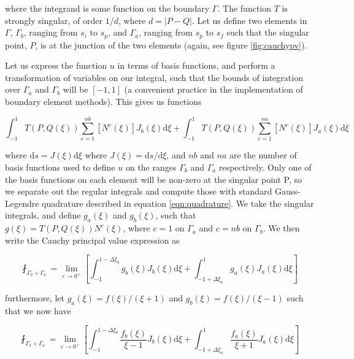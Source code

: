 where the integrand is some function on the boundary $\Gamma$. The function $T$ is strongly singular, of order $1/d$, where $d=|P-Q|$. Let us define two elements in $\Gamma$, $\Gamma_b$, ranging from $s_i$ to $s_p$, and $\Gamma_a$, ranging from $s_p$ to $s_f$ such that the singular point, $P$, is at the junction of the two elements (again, see figure \ref{fig:cauchypv}).

Let us express the function $u$ in terms of basis functions, and perform a transformation of variables on our integral, such that the bounds of integration over $\Gamma_a$ and $\Gamma_b$ will be $[-1,1]$ (a convenient practice in the implementation of boundary element methods). This gives us functions 

\begin{equation}
\int_{-1}^{1} T(P,Q(\xi)) \sum^{nb}_{c=1} \left[ N^c(\xi) \right] J_b(\xi) \mathrm{d}\xi + \int_{-1}^{1} T(P,Q(\xi)) \sum^{na}_{c=1} \left[ N^c(\xi) \right]  J_a(\xi) \mathrm{d}\xi 
\end{equation}

where $\mathrm{d}s = J(\xi) \mathrm{d}\xi$ where $J(\xi) = \mathrm{d}s/\mathrm{d}\xi$, and $nb$ and $na$ are the number of basis functions used to define $u$ on the ranges $\Gamma_b$ and $\Gamma_a$ respectively. Only one of the basis functions on each element will be non-zero at the singular point P, so we separate out the regular integrals and compute those with standard Gauss-Legendre quadrature described in equation \ref{eqn:quadrature}. We take the singular integrals, and define $g_a(\xi)$ and $g_b(\xi)$, such that $g(\xi)=T(P,Q(\xi)) N^c(\xi)$, where $c=1$ on $\Gamma_a$ and $c=nb$ on $\Gamma_b$. We then write the Cauchy principal value expression as


\begin{equation}
\fint_{\Gamma_b + \Gamma_a} = \lim_{ \varepsilon \rightarrow 0^+} \left[ \int_{-1}^{1 -\Delta \xi_b} g_b(\xi) J_b(\xi) \mathrm{d}\xi + \int_{-1 + \Delta \xi_a}^{1} g_a(\xi) J_a(\xi) \mathrm{d}\xi \right]
\end{equation}

furthermore, let $g_a(\xi) = f(\xi)/(\xi+1)$ and $g_b(\xi) = f(\xi)/(\xi-1)$ such that we now have

\begin{equation}
\fint_{\Gamma_b + \Gamma_a} = \lim_{ \varepsilon \rightarrow 0^+} \left[ \int_{-1}^{1 -\Delta \xi_b} \frac{f_b(\xi)}{\xi-1} J_b(\xi) \mathrm{d}\xi + \int_{-1 + \Delta \xi_a}^{1} \frac{f_a(\xi)}{\xi+1} J_a(\xi) \mathrm{d}\xi \right]
\end{equation}

